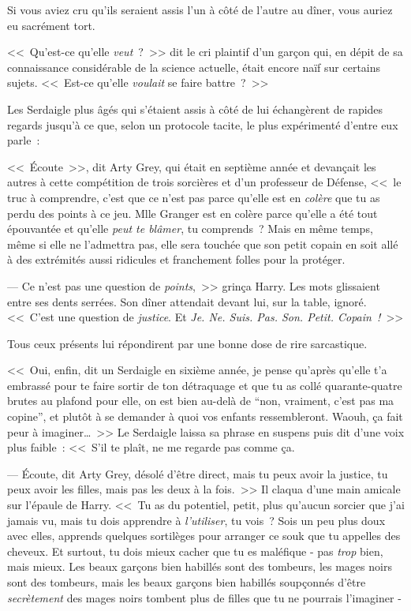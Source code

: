 \later

Si vous aviez cru qu'ils seraient assis l'un à côté de l'autre au dîner, vous auriez eu sacrément tort.

<<~Qu'est-ce qu'elle \emph{veut}~?~>> dit le cri plaintif d'un garçon qui, en dépit de sa connaissance considérable de la science actuelle, était encore naïf sur certains sujets. <<~Est-ce qu'elle \emph{voulait} se faire battre~?~>>

Les Serdaigle plus âgés qui s'étaient assis à côté de lui échangèrent de rapides regards jusqu'à ce que, selon un protocole tacite, le plus expérimenté d'entre eux parle~:

<<~Écoute~>>, dit Arty Grey, qui était en septième année et devançait les autres à cette compétition de trois sorcières et d'un professeur de Défense, <<~le truc à comprendre, c'est que ce n'est pas parce qu'elle est en \emph{colère} que tu as perdu des points à ce jeu. Mlle Granger est en colère parce qu'elle a été tout épouvantée et qu'elle \emph{peut te blâmer}, tu comprends~? Mais en même temps, même si elle ne l'admettra pas, elle sera touchée que son petit copain en soit allé à des extrémités aussi ridicules et franchement folles pour la protéger.

--- Ce n'est pas une question de \emph{points},~>> grinça Harry. Les mots glissaient entre ses dents serrées. Son dîner attendait devant lui, sur la table, ignoré. <<~C'est une question de \emph{justice}. Et \emph{Je. Ne. Suis. Pas. Son. Petit. Copain~!}~>>

Tous ceux présents lui répondirent par une bonne dose de rire sarcastique.

<<~Oui, enfin, dit un Serdaigle en sixième année, je pense qu'après qu'elle t'a embrassé pour te faire sortir de ton détraquage et que tu as collé quarante-quatre brutes au plafond pour elle, on est bien au-delà de “non, vraiment, c'est pas ma copine”, et plutôt à se demander à quoi vos enfants ressembleront. Waouh, ça fait peur à imaginer…~>> Le Serdaigle laissa sa phrase en suspens puis dit d'une voix plus faible~: <<~S'il te plaît, ne me regarde pas comme ça.

--- Écoute, dit Arty Grey, désolé d'être direct, mais tu peux avoir la justice, tu peux avoir les filles, mais pas les deux à la fois.~>> Il claqua d'une main amicale sur l'épaule de Harry. <<~Tu as du potentiel, petit, plus qu'aucun sorcier que j'ai jamais vu, mais tu dois apprendre à \emph{l'utiliser}, tu vois~? Sois un peu plus doux avec elles, apprends quelques sortilèges pour arranger ce souk que tu appelles des cheveux. Et surtout, tu dois mieux cacher que tu es maléfique - pas \emph{trop} bien, mais mieux. Les beaux garçons bien habillés sont des tombeurs, les mages noirs sont des tombeurs, mais les beaux garçons bien habillés soupçonnés d'être \emph{secrètement} des mages noirs tombent plus de filles que tu ne pourrais l'imaginer -

